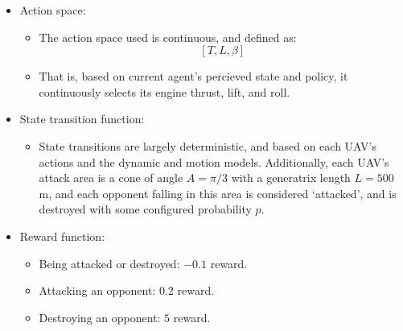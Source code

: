 \documentclass{article}
\begin{document}
\begin{itemize}
\begin{itemize}
\begin{enumerate}
\begin{enumerate}
                \item Angle-off $\phi^{AO} = \arccos(\frac{\vec{v_i} \cdot R_{im}}{||\vec{v_i}||})$.
            \end{enumerate}
            \item The observed state of each ally $[s_{i, m+1}, \ldots, s_{i, m+n}]$ which includes, for each ally $n$:
            \begin{enumerate}
                \item Distance $d_{in} = \sqrt{(x_i - x_n)^2 + (y_i - y_n)^2 + (z_i - z_n)^2}$.
                \item Relative position $R_{in}(x_i - x_n, y_i - y_n, z_i - z_n)$.
                \item Relative speed $V_{in} = v_i - v_n$.
                \item Relative velocity $\vec{V}_{in} = \vec{v}_i - \vec{v}_n$.
            \end{enumerate}
        \end{enumerate}
        \item When implemented, since there are an arbitrary, changing number of other UAVs based on different initializations
            $N$ and UAV destruction, the state is embedded as a fixed-length vector by an attention mechanism, where destroyed UAV
            are masked in a manner that prevents any of its state from affecting the continued policy training.
    \end{itemize}
    \item Action space:
    \begin{itemize}
        \item The action space used is continuous, and defined as:
        \[
        [T, L, \beta]
        \]
        \item That is, based on current agent's percieved state and policy, it continuously selects its engine thrust, lift, and
            roll.
    \end{itemize}
    \item State transition function:
    \begin{itemize}
        \item State transitions are largely deterministic, and based on each UAV's actions and the dynamic and motion models.
            Additionally, each UAV's attack area is a cone of angle $A = \pi/3$ with a generatrix length $L = 500$ m, and each
            opponent falling in this area is considered `attacked', and is destroyed with some configured probability $p$.
    \end{itemize}
    \item Reward function:
    \begin{itemize}
        \item Being attacked or destroyed: $-0.1$ reward.
        \item Attacking an opponent: $0.2$ reward.
        \item Destroying an opponent: $5$ reward.
    \end{itemize}
\end{itemize}
\end{document}
